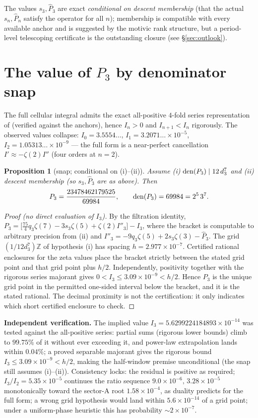\documentclass[11pt]{article}
\newtheorem{proposition}[theorem]{Proposition}\newtheorem{conjecture}[theorem]{Conjecture}
\theoremstyle{definition}\newtheorem{remark}[theorem]{Remark}
\newcommand{\Z}{\mathbb{Z}}\newcommand{\Q}{\mathbb{Q}}\newcommand{\Fp}{\mathbb{F}_p}
\newcommand{\zt}[1]{\zeta(#1)}
\begin{document}
The values $s_3,\hat P_3$ are exact \emph{conditional on descent membership}
(that the actual $s_n,\hat P_n$ satisfy the operator for all $n$); membership
is compatible with every available anchor and is suggested by the motivic rank
structure, but a period-level telescoping certificate is the outstanding
closure (see \S\ref{sec:outlook}).

\section{The value of $P_3$ by denominator snap}\label{sec:snap}

The full cellular integral admits the exact all-positive $4$-fold series
representation of \cite{BarnesNotes} (verified against the anchors), hence
$I_n>0$ and $I_{n+1}<I_n$ rigorously. The observed values collapse:
$I_0=3.5554\ldots$, $I_1=3.2071\ldots\times10^{-5}$,
$I_2=1.05313\ldots\times10^{-9}$ --- the full form is a near-perfect
cancellation $I'\approx-\zt2 I''$ (four orders at $n=2$).

\begin{proposition}[snap; conditional on (i)--(ii)]\label{prop:snap}
Assume \textup{(i)} $\operatorname{den}(P_3)\mid 12\,d_3^7$ and \textup{(ii)} descent
membership (so $s_3,\hat P_3$ are as above). Then
\[
P_3=\frac{23478462179525}{69984},\qquad
\operatorname{den}(P_3)=69984=2^5\,3^7 .
\]
\end{proposition}

\begin{proof}[Proof (no direct evaluation of $I_3$)]
By the filtration identity, $P_3=\bigl[\tfrac{75}{4}q_3\zt7-3s_3\zt5
+\zt2 I''_3\bigr]-I_3$, where the bracket is computable to arbitrary precision
from (ii) and $I''_3=-9q_3\zt5+2s_3\zt3-\hat P_3$. The grid $(1/12d_3^7)\Z$ of
hypothesis (i) has spacing $h=2.977\times10^{-7}$. Certified rational
enclosures for the zeta values place the bracket strictly between the stated
grid point and that grid point plus $h/2$. Independently, positivity together
with the rigorous series majorant gives
$0<I_3\le3.09\times10^{-9}<h/2$. Hence $P_3$ is the unique grid point in the
permitted one-sided interval below the bracket, and it is the stated rational.
The decimal proximity is not the certification: it only indicates which
short certified enclosure to check.
\end{proof}

\noindent\textbf{Independent verification.} The implied value
$I_3=5.6299224184893\times10^{-14}$ was tested against the all-positive
series: partial sums (rigorous lower bounds) climb to $99.75\%$ of it without
ever exceeding it, and power-law extrapolation lands within $0.04\%$; a proved
separable majorant gives the rigorous bound $I_3\le3.09\times10^{-9}<h/2$,
making the half-window premise unconditional (the snap still assumes
(i)--(ii)). Consistency locks: the
residual is positive as required; $I_3/I_2=5.35\times10^{-5}$ continues the
ratio sequence $9.0\times10^{-6},\,3.28\times10^{-5}$ monotonically toward the
sector-A root $1.58\times10^{-4}$, as duality predicts for the full form; a
wrong grid hypothesis would land within $5.6\times10^{-14}$ of a grid point;
under a uniform-phase heuristic this has probability $\sim2\times10^{-7}$.
\end{document}
